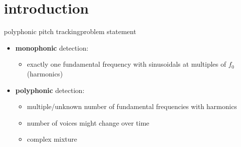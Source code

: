     \section[intro]{introduction}
        \begin{frame}{polyphonic pitch tracking}{problem statement}
            \begin{itemize}
                \item \textbf{monophonic} detection:
                    \begin{itemize}
                        \item   exactly one fundamental frequency with sinusoidals at multiples of $f_0$ (harmonics)
                    \end{itemize}
                \bigskip
                \item   \textbf{polyphonic} detection:
                    \begin{itemize}
                        \item   multiple/unknown number of fundamental frequencies with harmonics
                        \item   number of voices might change over time
                        \item   complex mixture
                    \end{itemize}
            \end{itemize}
        \end{frame}
